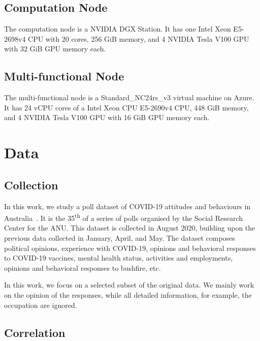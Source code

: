 \documentclass[11pt,twocolumn,letterpaper]{article}
\begin{document}
\subsection{Computation Node}\label{node:comp}

The computation node is a NVIDIA DGX Station.
It has one Intel Xeon E5-2698v4 CPU with 20 cores, 256 GiB memory, and 4 NVIDIA Tesla V100 GPU with 32 GiB GPU memory each.

\subsection{Multi-functional Node}\label{node:multi}

The multi-functional node is a Standard\_NC24rs\_v3 virtual machine on Azure.
It has 24 vCPU cores of a Intel Xeon CPU E5-2690v4 CPU, 448 GiB memory, and 4 NVIDIA Tesla V100 GPU with 16 GiB GPU memory each.

\section{Data}

\subsection{Collection}\label{collection}

In this work, we study a poll dataset of COVID-19 attitudes and behaviours in Australia~\cite{data}.
It is the 35\textsuperscript{th} of a series of polls organised by the Social Research Center for the ANU.
This dataset is collected in August 2020, building upon the previous data collected in January, April, and May.
The dataset composes political opinions, experience with COVID-19, opinions and behavioral responses to COVID-19 vaccines, mental health status, activities and employments, opinions and behavioral responses to bushfire, etc.

In this work, we focus on a selected subset of the original data.
We mainly work on the opinion of the responses, while all detailed information, for example, the occupation are ignored.

\subsection{Correlation}\label{correlation}
\end{document}

